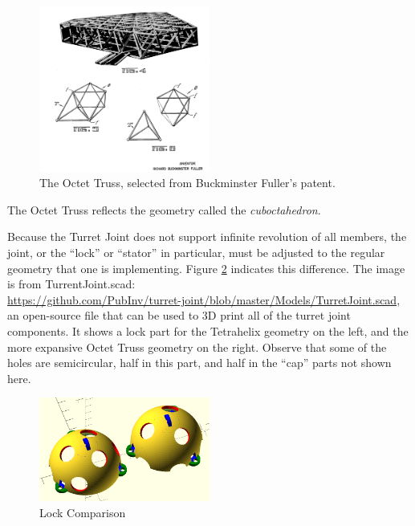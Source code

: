\documentclass[11pt]{article}
\begin{document}
\begin{figure}[H]
  \centering
    \includegraphics[width=0.5\textwidth]{figures/OctetTrussSelection.png}
    \caption[The Octet Truss]{The Octet Truss, selected from Buckminster Fuller's patent.}
      \label{octet-truss-patent}
\end{figure}

The Octet Truss reflects the geometry called the \emph{cuboctahedron}.

Because the Turret Joint does not support infinite revolution of all members, the joint, or the ``lock'' or ``stator'' in particular,
must be adjusted to the regular geometry that one is implementing.  Figure \ref{lockcomparison} indicates this difference.
The image is from TurrentJoint.scad:\\
\url{https://github.com/PubInv/turret-joint/blob/master/Models/TurretJoint.scad}, an
open-source file that can be used to 3D print all of the turret joint components.
It shows a lock part for the Tetrahelix geometry
on the left, and the more expansive Octet Truss geometry on the right. Observe that some of the holes are
semicircular, half in this part,
and half in the ``cap'' parts not shown here.

\begin{figure}[H]
  \centering
    \includegraphics[width=0.5\textwidth]{figures/TetrahelixLockVsOctetTrussLock.png}
    \caption[Lock Comparison]{Lock Comparison}
      \label{lockcomparison}
\end{figure}
\end{document}
